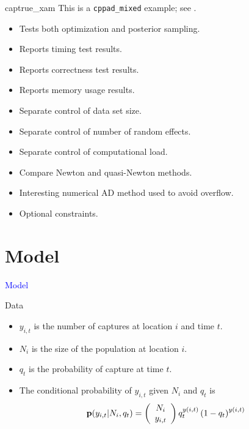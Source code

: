 \documentclass{beamer}
\newcommand{\Blue}[1]{\textcolor{blue}{#1}}
\newcommand{\B}[1]{{\bf #1}}
\newcommand{\Section}[1]{
	\section{#1}
	\begin{frame}
	\begin{center}
	\Blue{ \Large{#1} }
	\end{center}
	\end{frame}
}
\begin{document}
\begin{frame}{captrue\_xam}
This is a \texttt{cppad\_mixed} example; see  \cite{Royle2004}.

\begin{itemize}

\item
Tests both optimization and posterior sampling.
\pause

\item
Reports timing test results.
\pause

\item
Reports correctness test results.
\pause

\item
Reports memory usage results.
\pause

\item
Separate control of data set size.
\pause

\item
Separate control of number of random effects.
\pause

\item
Separate control of computational load.
\pause

\item
Compare Newton and quasi-Newton methods.
\pause

\item
Interesting numerical AD method used to avoid overflow.
\pause

\item
Optional constraints.

\end{itemize}
\end{frame}

\Section{Model}

\begin{frame}{Data}
\begin{itemize}

\item
$y_{i,t}$ is the number of captures at location $i$ and time $t$.
\pause

\item
$N_i$ is the size of the population at location $i$.
\pause

\item
$q_t$ is the probability of capture at time $t$.
\pause

\item
The conditional probability of $y_{i,t}$ given $N_i$ and $q_t$ is
\[
\B{p} ( y_{i,t} | N_i , q_t )
=
\left( \begin{array}{c} N_i \\ y_{i,t} \end{array} \right)
q_t^{y(i,t)} \left( 1 - q_t\right)^{y(i,t)}
\]

\end{itemize}
\end{frame}
\end{document}
